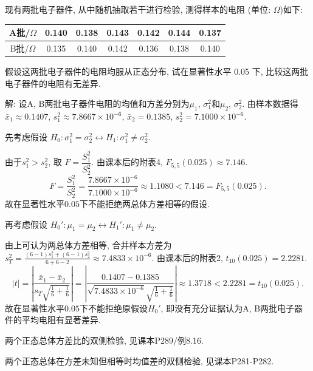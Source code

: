 \documentclass[standard]{ExBook}
\renewenvironment{shaded}{%
  \def\FrameCommand{\fboxsep=\FrameSep \colorbox{shadecolor}}%
  \MakeFramed{\advance\hsize-\width \FrameRestore}%
}{%
  \endMakeFramed
}
\begin{document}
\begin{qitems}
    \begin{bbox}
    \begin{shaded}
        \qitem
现有两批电子器件, 从中随机抽取若干进行检验, 测得样本的电阻 (单位: $\Omega$)如下:
\begin{center}
\setlength{\tabcolsep}{19pt}
\begin{tabular}{c|cccccc}
\hline
A批/$\Omega$ & 0.140 & 0.138 & 0.143 & 0.142 & 0.144 & 0.137 \\
\hline
B批/$\Omega$ & 0.135 & 0.140 & 0.142 & 0.136 & 0.138 & 0.140 \\
\hline
\end{tabular}
\end{center}
假设这两批电子器件的电阻均服从正态分布, 试在显著性水平 0.05 下, 比较这两批电子器件的电阻有无差异.
    \end{shaded}
    \end{bbox}

\vspace{\dimexpr2.5cm-5em\relax}

解: 设A, B两批电子器件电阻的均值和方差分别为$\mu_1$, $\sigma_1^2$和$\mu_2$, $\sigma_2^2$. 由样本数据得
$
\bar{x}_1\approx0.1407
$,
$
s_1^2\approx7.8667\times10^{-6}
$,
$
\bar{x}_2=0.1385
$,
$
s_2^2=7.1000\times10^{-6}
$.

先考虑假设
$
H_0:\sigma_1^2=\sigma_2^2
\longleftrightarrow
H_1:\sigma_1^2\neq\sigma_2^2
$.

由于$s_1^2>s_2^2$, 取
$
F=\dfrac{S_1^2}{S_2^2}
$.
由课本后的附表4, $F_{5,5}(0.025)\approx7.146$.
$$
F
=
\frac{S_1^2}{S_2^2}
=
\frac{7.8667\times10^{-6}}{7.1000\times10^{-6}}
\approx1.1080
<
7.146
=
F_{5,5}(0.025).
$$
故在显著性水平$0.05$下不能拒绝两总体方差相等的假设.

再考虑假设
$
H_0':\mu_1=\mu_2
\longleftrightarrow
H_1':\mu_1\neq\mu_2
$.

由上可认为两总体方差相等, 合并样本方差为
$
s_T^2
=
\frac{(6-1)s_1^2+(6-1)s_2^2}{6+6-2}
\approx7.4833\times10^{-6}
$.
由课本后的附表2, $t_{10}(0.025)=2.2281$.
$$
|t|
=
\left|
\frac{\bar{x}_1-\bar{x}_2}
{s_T\sqrt{\frac{1}{6}+\frac{1}{6}}}
\right|
=
\left|
\frac{0.1407-0.1385}
{\sqrt{7.4833\times10^{-6}}\sqrt{\frac{1}{6}+\frac{1}{6}}}
\right|
\approx1.3718
<
2.2281
=
t_{10}(0.025).
$$
故在显著性水平$0.05$下不能拒绝原假设$H_0'$, 即没有充分证据认为A, B两批电子器件的平均电阻有显著差异.

\textcolor{themeColor}{\selectfont {} 两个正态总体方差比的双侧检验, 见课本P289/例8.16.}

\textcolor{themeColor}{\selectfont {} 两个正态总体在方差未知但相等时均值差的双侧检验, 见课本P281-P282.}


\end{qitems}
\end{document}
